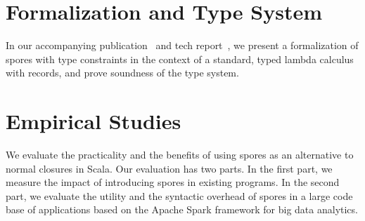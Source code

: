 \documentclass[english]{lni}
\begin{document}






\vspace{-7mm}
\section{Formalization and Type System}
\vspace{-5mm}
In our accompanying publication~\cite{spores} and tech report~\cite{sporestr},
we present a formalization of spores with type constraints in the context of a
standard, typed lambda calculus with records, and prove soundness of the type
system.{}

\vspace{-7mm}
\section{Empirical Studies}
\vspace{-5mm}
We evaluate the practicality and the benefits of using spores as an
alternative to normal closures in Scala. Our evaluation has two parts. In the
first part, we measure the impact of introducing spores in existing programs.
In the second part, we evaluate the utility and the syntactic overhead of
spores in a large code base of applications based on the Apache Spark
framework for big data analytics.
\end{document}
